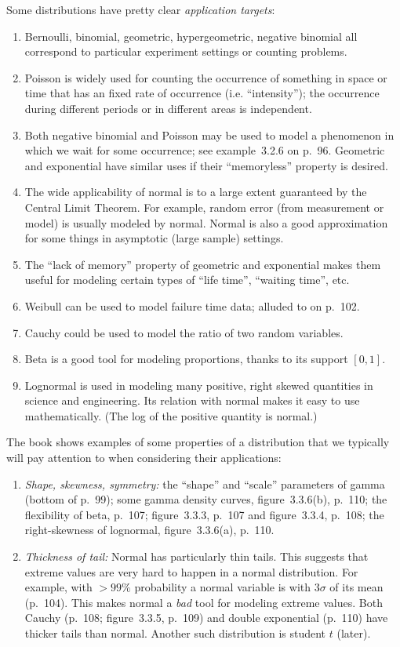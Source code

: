 \documentclass[12pt]{article}
\begin{document}
Some distributions have pretty clear \emph{application targets}:
\begin{enumerate}
\item Bernoulli, binomial, geometric, hypergeometric, negative binomial
    all correspond to particular experiment settings
    or counting problems.
\item Poisson is widely used for counting the occurrence of something
    in space or time that has an fixed rate of occurrence (i.e.\@
    ``intensity''); the occurrence during different periods
    or in different areas is independent.
\item Both negative binomial and Poisson may be used to model a
    phenomenon in which we wait for some occurrence;
    see example~3.2.6 on p.~96.
    Geometric and exponential have similar uses if their ``memoryless''
    property is desired.
\item The wide applicability of normal is to a large extent guaranteed
    by the Central Limit Theorem.
    For example, random error (from measurement or model)
    is usually modeled by normal.
    Normal is also a good approximation for some things in asymptotic
    (large sample) settings.
\item The ``lack of memory'' property of geometric and exponential
    makes them useful for modeling certain types of ``life time'',
    ``waiting time'', etc.
\item Weibull can be used to model failure time data;
    alluded to on p.~102.
\item Cauchy could be used to model the ratio of two random variables.
\item Beta is a good tool for modeling proportions,
    thanks to its support $[0, 1]$.
\item Lognormal is used in modeling many positive, right skewed
    quantities in science and engineering.
    Its relation with normal makes it easy to use mathematically.
    (The log of the positive quantity is normal.)
\end{enumerate}

The book shows examples of some properties of a distribution
that we typically will pay attention to when considering their
applications:
\begin{enumerate}
\item \emph{Shape, skewness, symmetry:}
    the ``shape'' and ``scale'' parameters of gamma (bottom of p.~99);
    some gamma density curves, figure~3.3.6(b), p.~110;
    the flexibility of beta, p.~107;
    figure~3.3.3, p.~107 and figure~3.3.4, p.~108;
    the right-skewness of lognormal, figure~3.3.6(a), p.~110.
\item \emph{Thickness of tail:}
    Normal has particularly thin tails.
    This suggests that extreme values are very hard to happen
    in a normal distribution.
    For example, with $> 99\%$ probability a normal variable
    is with $3\sigma$ of its mean (p.~104).
    This makes normal a \emph{bad} tool for modeling extreme values.
    Both Cauchy (p.~108; figure~3.3.5, p.~109)
    and double exponential (p.~110) have thicker tails than normal.
    Another such distribution is student $t$ (later).
\end{enumerate}
\end{document}
